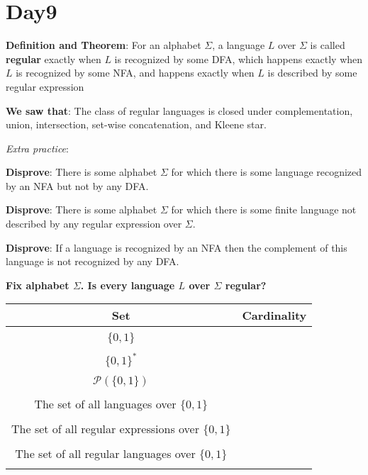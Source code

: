 \documentclass[12pt, oneside]{article}
\begin{document}
\section*{Day9}


{\bf Definition and Theorem}: For an alphabet $\Sigma$, a language $L$ over $\Sigma$ is called {\bf regular}
exactly when $L$ is recognized by some DFA, which happens exactly when $L$ is recognized by some NFA, 
and happens exactly when $L$ is described by some regular expression

{\bf We saw that}: The class of regular languages is closed under complementation, union, 
intersection, set-wise concatenation, and Kleene star.

{\it Extra practice}: 

{\bf Disprove}: There is some alphabet $\Sigma$ for which there is 
some language recognized by an NFA but not by any DFA.

\vfill

{\bf Disprove}: There is some alphabet $\Sigma$ for which there is 
some finite language not described by any regular expression over $\Sigma$.

\vfill

{\bf Disprove}: If a language is recognized by an NFA 
then the complement of this language is not recognized by any DFA.

\vfill


{\bf Fix alphabet $\Sigma$. Is every language $L$ over $\Sigma$ regular?}

\begin{center}
\begin{tabular}{c|c}
Set & Cardinality \\
\hline
& \\
$\{0,1\}$ & \\
& \\
$\{0,1\}^*$ & \\
& \\
$\mathcal{P}( \{0,1\})$ & \\
& \\
The set of all languages over $\{0,1\}$ & \\
& \\
The set of all regular expressions over $\{0,1\}$ & \\
& \\
The set of all regular languages over $\{0,1\}$ & \\
& \\
\end{tabular}
\end{center}
\end{document}
